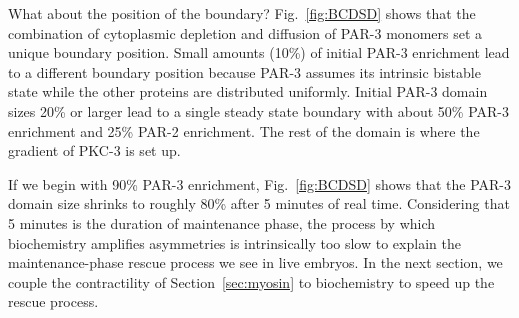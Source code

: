 \documentclass[11pt]{article}
\newcommand{\6}[1]{#1_{\text{6}}}
\newcommand{\3}[1]{#1_{\text{3}}}
\begin{document}
What about the position of the boundary? Fig.\ \ref{fig:BCDSD} shows that the combination of cytoplasmic depletion and diffusion of PAR-3 monomers set a unique boundary position. Small amounts (10\%) of initial PAR-3 enrichment lead to a different boundary position because PAR-3 assumes its intrinsic bistable state while the other proteins are distributed uniformly. Initial PAR-3 domain sizes 20\% or larger lead to a single steady state boundary with about 50\% PAR-3 enrichment and 25\% PAR-2 enrichment. The rest of the domain is where the gradient of PKC-3 is set up.

If we begin with 90\% PAR-3 enrichment, Fig.\ \ref{fig:BCDSD} shows that the PAR-3 domain size shrinks to roughly 80\% after 5 minutes of real time. Considering that 5 minutes is the duration of maintenance phase, the process by which biochemistry amplifies asymmetries is intrinsically too slow to explain the maintenance-phase rescue process we see in live embryos. In the next section, we couple the contractility of Section\ \ref{sec:myosin} to biochemistry to speed up the rescue process. 
\end{document}
